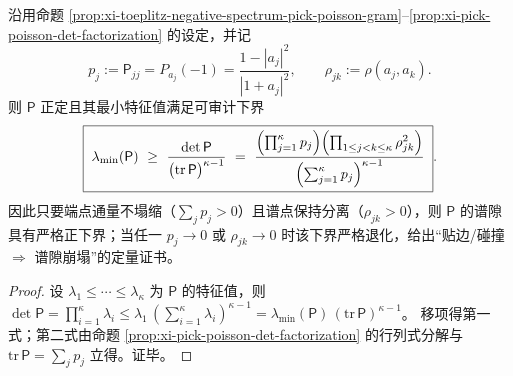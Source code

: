 \begin{corollary}\label{cor:xi-pick-poisson-gap-lower-bound}
沿用命题 \ref{prop:xi-toeplitz-negative-spectrum-pick-poisson-gram}--\ref{prop:xi-pick-poisson-det-factorization} 的设定，并记
\[
p_j:=\mathsf P_{jj}=P_{a_j}(-1)=\frac{1-|a_j|^2}{|1+a_j|^2},
\qquad
\rho_{jk}:=\rho(a_j,a_k).
\]
则 \(\mathsf P\) 正定且其最小特征值满足可审计下界
\[
\boxed{\;
\lambda_{\min}(\mathsf P)\ \ge\ \frac{\det\mathsf P}{\bigl(\mathrm{tr}\,\mathsf P\bigr)^{\kappa-1}}
\ =\
\frac{\Bigl(\prod_{j=1}^{\kappa}p_j\Bigr)\Bigl(\prod_{1\le j<k\le\kappa}\rho_{jk}^2\Bigr)}
{\Bigl(\sum_{j=1}^{\kappa}p_j\Bigr)^{\kappa-1}}\; }.
\]
因此只要端点通量不塌缩（\(\sum_j p_j>0\)）且谱点保持分离（\(\rho_{jk}>0\)），则 \(\mathsf P\) 的谱隙具有严格正下界；当任一 \(p_j\to0\) 或 \(\rho_{jk}\to0\) 时该下界严格退化，给出“贴边/碰撞 \(\Rightarrow\) 谱隙崩塌”的定量证书。
\end{corollary}
\begin{proof}
设 \(\lambda_1\le\cdots\le\lambda_\kappa\) 为 \(\mathsf P\) 的特征值，则
\(
\det\mathsf P=\prod_{i=1}^{\kappa}\lambda_i
\le \lambda_1\,(\sum_{i=1}^{\kappa}\lambda_i)^{\kappa-1}
=\lambda_{\min}(\mathsf P)\,(\mathrm{tr}\,\mathsf P)^{\kappa-1}
\)。
移项得第一式；第二式由命题 \ref{prop:xi-pick-poisson-det-factorization} 的行列式分解与 \(\mathrm{tr}\,\mathsf P=\sum_j p_j\) 立得。证毕。
\end{proof}

